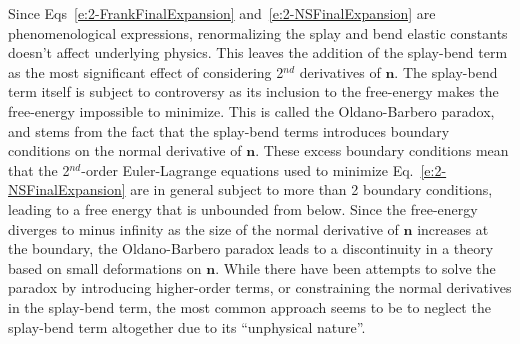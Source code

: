 Since Eqs~\ref{e:2-FrankFinalExpansion} and~\ref{e:2-NSFinalExpansion} are phenomenological expressions, renormalizing the splay and bend elastic constants doesn't affect underlying physics.
This leaves the addition of the splay-bend term as the most significant effect of considering 2$^{nd}$ derivatives of $\mathbf{n}$.
The splay-bend term itself is subject to controversy as its inclusion to the free-energy makes the free-energy impossible to minimize.
This is called the Oldano-Barbero paradox, and stems from the fact that the splay-bend terms introduces boundary conditions on the normal derivative of $\mathbf{n}$.
These excess boundary conditions mean that the 2$^{nd}$-order Euler-Lagrange equations used to minimize Eq.~\ref{e:2-NSFinalExpansion} are in general subject to more than 2 boundary conditions, leading to a free energy that is unbounded from below.
Since the free-energy diverges to minus infinity as the size of the normal derivative of $\mathbf{n}$ increases at the boundary, the Oldano-Barbero paradox leads to a discontinuity in a theory based on small deformations on $\mathbf{n}$.
While there have been attempts to solve the paradox by introducing higher-order terms, or constraining the normal derivatives in the splay-bend term, the most common approach seems to be to neglect the splay-bend term altogether due to its ``unphysical nature''.

